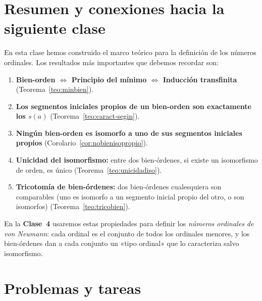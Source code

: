 \section{Resumen y conexiones hacia la siguiente clase}

En esta clase hemos construido el marco teórico para la definición de los números ordinales. Los resultados más importantes que debemos recordar son:

\begin{importante}
\begin{enumerate}[leftmargin=2em, label=\textbf{\arabic*.}]
  \item \textbf{Bien-orden $\Leftrightarrow$ Principio del mínimo $\Leftrightarrow$ Inducción transfinita} (Teorema~\ref{teo:minbien}).

  \item \textbf{Los segmentos iniciales propios de un bien-orden son exactamente los $s(a)$} (Teorema~\ref{teo:caract-segin}).

  \item \textbf{Ningún bien-orden es isomorfo a uno de sus segmentos iniciales propios} (Corolario~\ref{cor:nobienisopropio}).

  \item \textbf{Unicidad del isomorfismo:} entre dos bien-órdenes, si existe un isomorfismo de orden, es único (Teorema~\ref{teo:unicidadiso}).

  \item \textbf{Tricotomía de bien-órdenes:} dos bien-órdenes cualesquiera son comparables (uno es isomorfo a un segmento inicial propio del otro, o son isomorfos) (Teorema~\ref{teo:tricobien}).
\end{enumerate}
\end{importante}

En la \textbf{Clase~4} usaremos estas propiedades para definir los \emph{números ordinales de von Neumann}: cada ordinal es el conjunto de todos los ordinales menores, y los bien-órdenes dan a cada conjunto un «tipo ordinal» que lo caracteriza salvo isomorfismo.

\section{Problemas y tareas}

